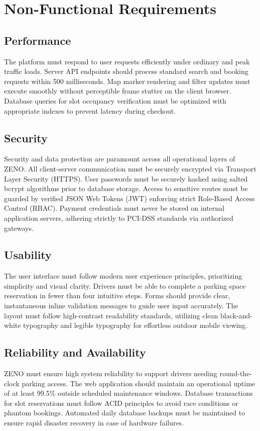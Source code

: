\documentclass[12pt,a4paper]{article}
\begin{document}
\section{Non-Functional Requirements}

\subsection{Performance}
The platform must respond to user requests efficiently under ordinary and peak traffic loads. Server API endpoints should process standard search and booking requests within 500 milliseconds. Map marker rendering and filter updates must execute smoothly without perceptible frame stutter on the client browser. Database queries for slot occupancy verification must be optimized with appropriate indexes to prevent latency during checkout.

\subsection{Security}
Security and data protection are paramount across all operational layers of ZENO. All client-server communication must be securely encrypted via Transport Layer Security (HTTPS). User passwords must be securely hashed using salted bcrypt algorithms prior to database storage. Access to sensitive routes must be guarded by verified JSON Web Tokens (JWT) enforcing strict Role-Based Access Control (RBAC). Payment credentials must never be stored on internal application servers, adhering strictly to PCI-DSS standards via authorized gateways.

\subsection{Usability}
The user interface must follow modern user experience principles, prioritizing simplicity and visual clarity. Drivers must be able to complete a parking space reservation in fewer than four intuitive steps. Forms should provide clear, instantaneous inline validation messages to guide user input accurately. The layout must follow high-contrast readability standards, utilizing clean black-and-white typography and legible typography for effortless outdoor mobile viewing.

\subsection{Reliability and Availability}
ZENO must ensure high system reliability to support drivers needing round-the-clock parking access. The web application should maintain an operational uptime of at least 99.5\% outside scheduled maintenance windows. Database transactions for slot reservations must follow ACID principles to avoid race conditions or phantom bookings. Automated daily database backups must be maintained to ensure rapid disaster recovery in case of hardware failures.
\end{document}
